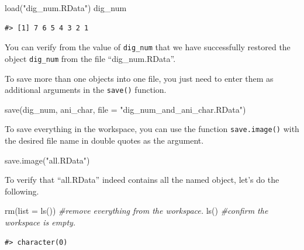 \documentclass[
]{book}
\newenvironment{Shaded}{\begin{snugshade}}{\end{snugshade}}
\newcommand{\AttributeTok}[1]{\textcolor[rgb]{0.77,0.63,0.00}{#1}}
\newcommand{\CommentTok}[1]{\textcolor[rgb]{0.56,0.35,0.01}{\textit{#1}}}
\newcommand{\FunctionTok}[1]{\textcolor[rgb]{0.00,0.00,0.00}{#1}}
\newcommand{\NormalTok}[1]{#1}
\newcommand{\StringTok}[1]{\textcolor[rgb]{0.31,0.60,0.02}{#1}}
\begin{document}
\begin{Shaded}
\begin{Highlighting}[]
\FunctionTok{load}\NormalTok{(}\StringTok{"dig\_num.RData"}\NormalTok{)}
\NormalTok{dig\_num}
\end{Highlighting}
\end{Shaded}

\begin{verbatim}
#> [1] 7 6 5 4 3 2 1
\end{verbatim}

You can verify from the value of \texttt{dig\_num} that we have successfully restored the object \texttt{dig\_num} from the file ``dig\_num.RData''.

To save more than one objects into one file, you just need to enter them as additional arguments in the \texttt{save()} function.

\begin{Shaded}
\begin{Highlighting}[]
\FunctionTok{save}\NormalTok{(dig\_num, ani\_char, }\AttributeTok{file =} \StringTok{"dig\_num\_and\_ani\_char.RData"}\NormalTok{)}
\end{Highlighting}
\end{Shaded}

To save everything in the workspace, you can use the function \texttt{save.image()} with the desired file name in double quotes as the argument.

\begin{Shaded}
\begin{Highlighting}[]
\FunctionTok{save.image}\NormalTok{(}\StringTok{"all.RData"}\NormalTok{)}
\end{Highlighting}
\end{Shaded}

To verify that ``all.RData'' indeed contains all the named object, let's do the following.

\begin{Shaded}
\begin{Highlighting}[]
\FunctionTok{rm}\NormalTok{(}\AttributeTok{list =} \FunctionTok{ls}\NormalTok{())  }\CommentTok{\#remove everything from the workspace.}
\FunctionTok{ls}\NormalTok{()             }\CommentTok{\#confirm the workspace is empty.}
\end{Highlighting}
\end{Shaded}

\begin{verbatim}
#> character(0)
\end{verbatim}
\end{document}
